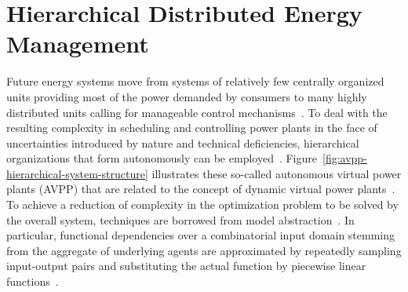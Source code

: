 \documentclass[conference]{IEEEtran}
\begin{document}
\section{Hierarchical Distributed Energy Management}
Future energy systems move from systems of relatively few centrally organized units
providing most of the power demanded by consumers to many highly distributed units calling
for manageable control mechanisms~\cite{Ramchurn2012}.
To deal with the resulting complexity in scheduling and controlling power plants in the face of 
uncertainties introduced by nature and technical deficiencies, hierarchical organizations 
that form autonomously can be employed~\cite{Anders-TAAS-2015}.
Figure~\ref{fig:avpp-hierarchical-system-structure} illustrates these so-called autonomous virtual power plants (AVPP)
that are related to the concept of dynamic virtual power plants~\cite{niesse2014conjoint}. To achieve a reduction of complexity in the optimization 
problem to be solved by the overall system, techniques are borrowed from model abstraction~\cite{Frantz_Taxonomy}. 
In particular, functional dependencies over a combinatorial input domain stemming from the
aggregate of underlying agents are approximated by repeatedly sampling input-output pairs
and substituting the actual function by piecewise linear functions~\cite{Schiendorfer2014}. 
\end{document}
